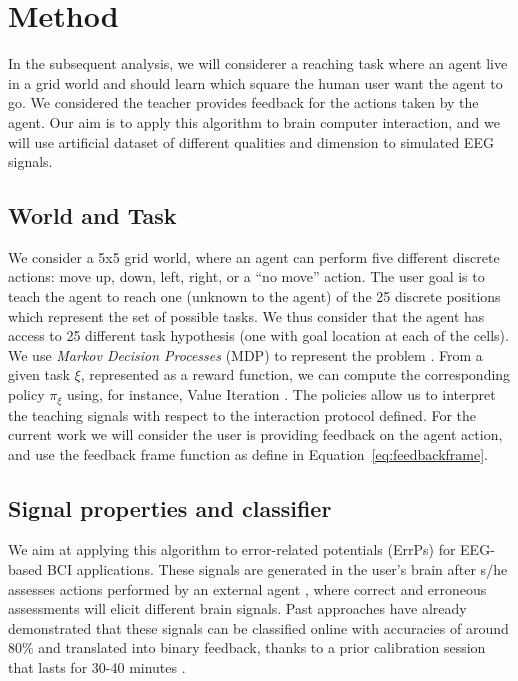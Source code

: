 \section{Method}
\label{chapter:planning:method}

In the subsequent analysis, we will considerer a reaching task where an agent live in a grid world and should learn which square the human user want the agent to go. We considered the teacher provides feedback for the actions taken by the agent. Our aim is to apply this algorithm to brain computer interaction, and we will use artificial dataset of different qualities and dimension to simulated EEG signals.

\subsection{World and Task}
We consider a 5x5 grid world, where an agent can perform five different discrete actions: move up, down, left, right, or a ``no move'' action. The user goal is to teach the agent to reach one (unknown to the agent) of the 25 discrete positions which represent the set of possible tasks. We thus consider that the agent has access to 25 different task hypothesis (one with goal location at each of the cells). We use \textit{Markov Decision Processes} (MDP) to represent the problem \cite{sutton1998reinforcement}. From a given task $\xi$, represented as a reward function, we can compute the corresponding policy $\pi_{\xi}$ using, for instance, Value Iteration \cite{sutton1998reinforcement}. The policies allow us to interpret the teaching signals with respect to the interaction protocol defined. For the current work we will consider the user is providing feedback on the agent action, and use the feedback frame function as define in Equation~\ref{eq:feedbackframe}.

\subsection{Signal properties and classifier}

We aim at applying this algorithm to error-related potentials (ErrPs) for EEG-based BCI applications. These signals are generated in the user's brain after s/he assesses actions performed by an external agent \cite{chavarriaga2010learning}, where correct and erroneous assessments will elicit different brain signals. Past approaches have already demonstrated that these signals can be classified online with accuracies of around 80\% and translated into binary feedback, thanks to a prior calibration session that lasts for 30-40 minutes \cite{chavarriaga2010learning, iturrate2013task}.

